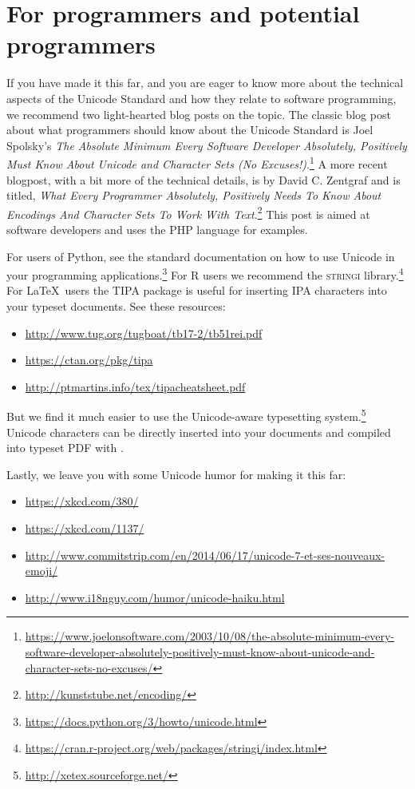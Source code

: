 \section{For programmers and potential programmers}
If you have made it this far, and you are eager to know more about the technical aspects of the Unicode Standard and how they relate to software programming, we recommend two light-hearted blog posts on the topic. The classic blog post about what programmers should know about the Unicode Standard is Joel Spolsky's \textit{The Absolute Minimum Every Software Developer Absolutely, Positively Must Know About Unicode and Character Sets (No Excuses!)}.\footnote{\url{https://www.joelonsoftware.com/2003/10/08/the-absolute-minimum-every-software-developer-absolutely-positively-must-know-about-unicode-and-character-sets-no-excuses/}} A more recent blogpost, with a bit more of the technical details, is by David C. Zentgraf and is titled, \textit{What Every Programmer Absolutely, Positively Needs To Know About Encodings And Character Sets To Work With Text}.\footnote{\url{http://kunststube.net/encoding/}} This post is aimed at software developers and uses the PHP language for examples.

For users of Python, see the standard documentation on how to use Unicode in your programming applications.\footnote{\url{https://docs.python.org/3/howto/unicode.html}} For R users we recommend the \textsc{stringi} library.\footnote{\url{https://cran.r-project.org/web/packages/stringi/index.html}} For \LaTeX~users the \textsc{TIPA} package is useful for inserting IPA characters into your typeset documents. See these resources:

\begin{itemize}
	\item \url{http://www.tug.org/tugboat/tb17-2/tb51rei.pdf}
	\item \url{https://ctan.org/pkg/tipa}
	\item \url{http://ptmartins.info/tex/tipacheatsheet.pdf}
\end{itemize}

\noindent But we find it much easier to use the Unicode-aware  typesetting system.\footnote{\url{http://xetex.sourceforge.net/}} Unicode characters can be directly inserted into your  documents and compiled into typeset PDF with .

Lastly, we leave you with some Unicode humor for making it this far:

\begin{itemize}
	\item \url{https://xkcd.com/380/}
	\item \url{https://xkcd.com/1137/}
	\item \url{http://www.commitstrip.com/en/2014/06/17/unicode-7-et-ses-nouveaux-emoji/}
	\item \url{http://www.i18nguy.com/humor/unicode-haiku.html}
\end{itemize}



